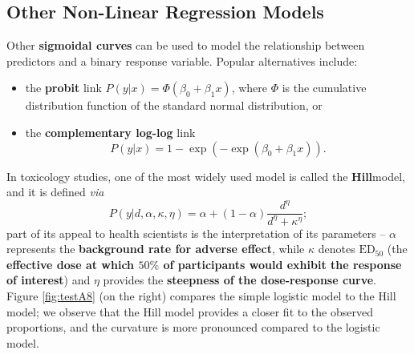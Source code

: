 \subsection{Other Non-Linear Regression Models}
Other \textbf{sigmoidal curves} can be used to model the relationship between predictors and a binary response variable. \newl Popular alternatives include:
\begin{itemize}[noitemsep]
\item the \textbf{probit} link $P(y|x)=\Phi(\beta_{0}+\beta_{1}x)$, where $\Phi$ is the cumulative distribution function of the standard normal distribution, or 
\item the \textbf{complementary log-log} link $$P(y|x)=1-\exp(-\exp(\beta_{0}+\beta_{1}x)).$$ \end{itemize}
In toxicology studies, one of the most widely used model is called the \textbf{Hill}model, and it is defined \textit{via} 
\begin{equation*}
    P(y|d,\alpha, \kappa, \eta)=\alpha + (1-\alpha)\frac{d^{\eta}}{d^{\eta}+\kappa^{\eta}};
\end{equation*}
part of its appeal to health scientists is the interpretation of its parameters -- $\alpha$ represents the \textbf{background rate for adverse effect}, while $\kappa$ denotes $\textrm{ED}_{50}$ (the \textbf{effective dose at which $50\%$ of participants would exhibit the response of interest}) and $\eta$ provides the \textbf{steepness of the dose-response curve}. \newl Figure \ref{fig:testA8} (on the right) compares the simple logistic model to the Hill model; we observe that the Hill model provides a closer fit to the observed proportions, and the curvature is more pronounced compared to the logistic model.





